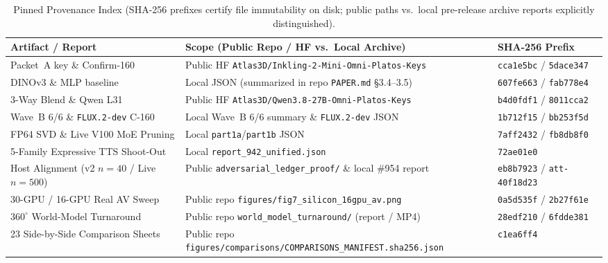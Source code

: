 \documentclass[10pt,twocolumn]{article}
\begin{document}
\begin{table}[t]
\centering
\caption{Pinned Provenance Index (SHA-256 prefixes certify file immutability on disk; public paths vs.\ local pre-release archive reports explicitly distinguished).}
\label{tab:evidence}
\scriptsize
\setlength{\tabcolsep}{4.0pt}
\begin{tabular}{@{}lll@{}}
\toprule
Artifact / Report & Scope (Public Repo / HF vs.\ Local Archive) & SHA-256 Prefix \\
\midrule
Packet~A key \& Confirm-160 & Public HF \texttt{Atlas3D/Inkling-2-Mini-Omni-Platos-Keys} & \texttt{cca1e5bc} / \texttt{5dace347} \\
DINOv3 \& MLP baseline & Local JSON (summarized in repo \texttt{PAPER.md} \S3.4--3.5) & \texttt{607fe663} / \texttt{fab778e4} \\
3-Way Blend \& Qwen L31 & Public HF \texttt{Atlas3D/Qwen3.8-27B-Omni-Platos-Keys} & \texttt{b4d0fdf1} / \texttt{8011cca2} \\
Wave~B 6/6 \& \texttt{FLUX.2-dev} C-160 & Local Wave~B 6/6 summary \& \texttt{FLUX.2-dev} JSON & \texttt{1b712f15} / \texttt{bb253f5d} \\
FP64 SVD \& Live V100 MoE Pruning & Local \texttt{part1a}/\texttt{part1b} JSON & \texttt{7aff2432} / \texttt{fb8db8f0} \\
5-Family Expressive TTS Shoot-Out & Local \texttt{report\_942\_unified.json} & \texttt{72ae01e0} \\
Host Alignment (v2 $n=40$ / Live $n=500$) & Public \texttt{adversarial\_ledger\_proof/} \& local \#954 report & \texttt{eb8b7923} / \texttt{att-40f18d23} \\
30-GPU / 16-GPU Real AV Sweep & Public repo \texttt{figures/fig7\_silicon\_16gpu\_av.png} & \texttt{0a5d535f} / \texttt{2b27f61e} \\
$360^\circ$ World-Model Turnaround & Public repo \texttt{world\_model\_turnaround/} (report / MP4) & \texttt{28edf210} / \texttt{6fdde381} \\
23 Side-by-Side Comparison Sheets & Public repo \texttt{figures/comparisons/COMPARISONS\_MANIFEST.sha256.json} & \texttt{c1ea6ff4} \\
\bottomrule
\end{tabular}
\end{table}
\end{document}
